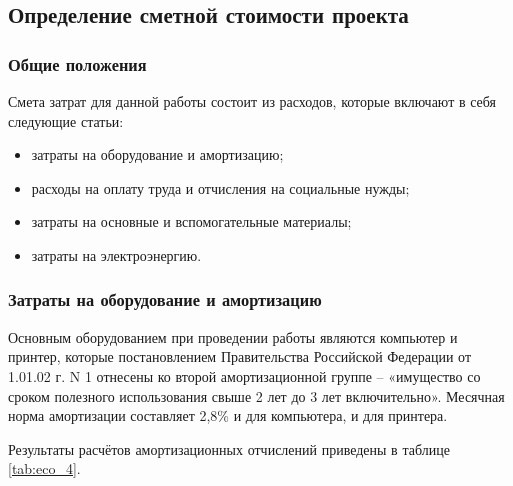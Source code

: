 \subsection{Определение сметной стоимости проекта}
\subsubsection{Общие положения}

Смета затрат для данной работы состоит из расходов, которые включают в себя следующие статьи:

\begin{itemize}
\item затраты на оборудование и амортизацию;
\item расходы на оплату труда и отчисления на социальные нужды;
\item затраты на основные и вспомогательные материалы;
\item затраты на электроэнергию.
\end{itemize}
\subsubsection{Затраты на оборудование и амортизацию}

Основным оборудованием при проведении работы являются компьютер и принтер, которые постановлением Правительства Российской Федерации от 1.01.02 г. N 1 отнесены ко второй амортизационной группе – «имущество со сроком полезного использования свыше 2 лет до 3 лет включительно». Месячная норма амортизации составляет 2,8\% и для компьютера, и для принтера.

Результаты расчётов амортизационных отчислений приведены в таблице \ref{tab:eco_4}.


